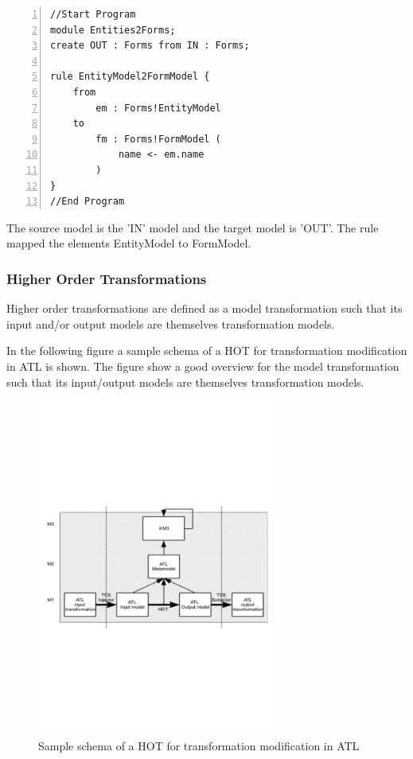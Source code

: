\documentclass{llncs}
\begin{document}
\begin{lstlisting}[language=ATL, numbers=left,xleftmargin=5.0ex, caption=Simple example for a ATL transformation, label=lst:shortexample]
//Start Program
module Entities2Forms;
create OUT : Forms from IN : Forms;

rule EntityModel2FormModel {
	from
		em : Forms!EntityModel
	to 
		fm : Forms!FormModel (
			name <- em.name
		)
}
//End Program
\end{lstlisting}

The source model is the 'IN' model and the target model is 'OUT'. The rule mapped the elements EntityModel to FormModel.

\subsubsection{Higher Order Transformations}

Higher order transformations are defined as a model transformation such that
its input and/or output models are themselves transformation models.\cite{Tisi:2009}

In the following figure a sample schema of a HOT for transformation modification
in ATL is shown. The figure show a good overview for the model transformation
such that its input/output models are themselves transformation models.

 \begin{figure}[tb]
	\centering
	\includegraphics[width=0.7\textwidth,natwidth=610,natheight=642]{figures/HOT.pdf}
	\caption{Sample schema of a HOT for transformation modification in ATL}
	\label{fig:samplefigure_pdf}
\end{figure}~\cite{misc:ModelingLanguages}
\end{document}

